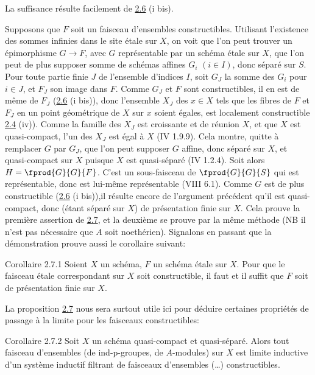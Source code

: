 \documentclass[10pt]{../fichiers-configuration-latex/smfart}
\begin{document}

La suffisance résulte facilement de \hyperref[IX.prop2.6]{2.6} (i bis).

Supposons que $F$ soit un faisceau d'ensembles
constructibles. Utilisant l'existence des sommes infinies dans le site
étale sur $X$, on voit que l'on peut trouver un épimorphisme
$G\rightarrow F$, avec $G$ représentable par un schéma étale sur $X$,
que l'on peut de plus supposer somme de schémas affines $G_i$ $(i\in I)$,
donc séparé sur $S$. Pour toute partie finie $J$ de l'ensemble
d'indices $I$, soit $G_J$ la somme des $G_i$ pour $i\in J$, et $F_J$
son image dans $F$. Comme $G_J$ et $F$ sont constructibles, il en est
de même de $F_J$ (\hyperref[IX.prop2.6]{2.6} (i bis)), donc l'ensemble $X_J$ des $x\in X$
tels que les fibres de $F$ et $F_J$ en un point géométrique de $X$ sur
$x$ soient égales, est localement constructible \hyperref[IX.prop2.4]{2.4} (iv)). Comme la
famille des $X_J$ est croissante et de réunion $X$, et que $X$ est
quasi-compact, l'un des $X_J$ est égal à $X$ (\EGA IV 1.9.9). Cela
montre, quitte à remplacer $G$ par $G_J$, que l'on peut supposer $G$
affine, donc séparé sur $X$, et quasi-compact sur $X$ puisque $X$ est
quasi-séparé (\EGA IV 1.2.4). Soit alors $H=\fprod{G}{G}{F}$. C'est un
sous-faisceau de $\fprod{G}{G}{S}$ qui est représentable, donc est
lui-même représentable (VIII 6.1). Comme $G$ est de plus constructible
(\hyperref[IX.prop2.6]{2.6} (i bis)),\pageoriginale il résulte encore de l'argument précédent
qu'il est quasi-compact, donc (étant séparé sur $X$) de présentation
finie sur $X$. Cela prouve la première assertion de \hyperref[IX.prop2.7]{2.7}, et la
deuxième se prouve par la même méthode (NB il n'est pas nécessaire que
$A$ soit noethérien). Signalons en passant que la démonstration prouve
aussi le corollaire suivant:

\begin{enonce*}{Corollaire 2.7.1}
Soient $X$ un schéma, $F$ un schéma étale sur $X$. Pour que le
faisceau étale correspondant sur $X$ soit constructible, il faut et il
suffit que $F$ soit de présentation finie sur $X$.
\end{enonce*}

La proposition \hyperref[IX.prop2.7]{2.7} nous sera surtout utile ici pour déduire certaines
propriétés de passage à la limite pour les faisceaux constructibles:

\begin{enonce*}{Corollaire 2.7.2}
Soit $X$ un schéma quasi-compact et quasi-séparé. Alors tout faisceau
d'ensembles (\resp de ind-p-groupes, \resp de $A$-modules) sur $X$ est
limite inductive d'un système inductif filtrant de faisceaux
d'ensembles (\resp\ldots) constructibles.
\end{enonce*}
\end{document}

